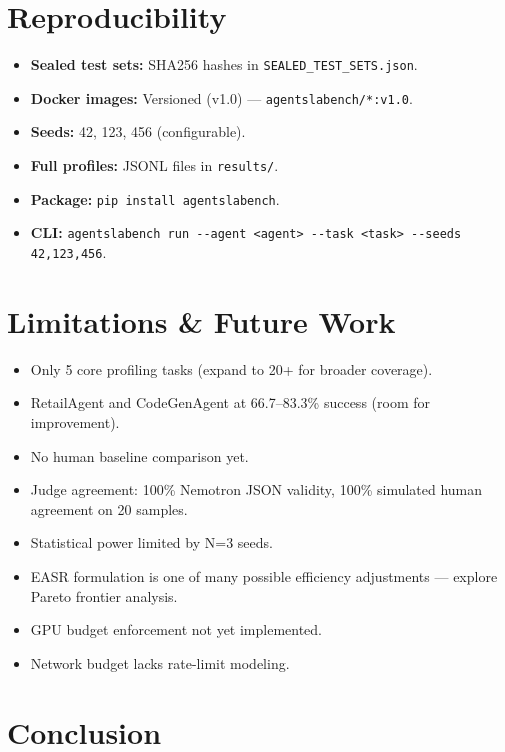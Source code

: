 \documentclass[letterpaper, 10 pt, conference]{ieeeconf}
\newcommand{\easr}{\textsc{EASR}}
\begin{document}
\section{Reproducibility}
\label{sec:repro}

\begin{itemize}
    \item \textbf{Sealed test sets:} SHA256 hashes in \texttt{SEALED\_TEST\_SETS.json}.
    \item \textbf{Docker images:} Versioned (v1.0) --- \texttt{agentslabench/*:v1.0}.
    \item \textbf{Seeds:} 42, 123, 456 (configurable).
    \item \textbf{Full profiles:} JSONL files in \texttt{results/}.
    \item \textbf{Package:} \texttt{pip install agentslabench}.
    \item \textbf{CLI:} \texttt{agentslabench run -{}-agent <agent> -{}-task <task> -{}-seeds 42,123,456}.
\end{itemize}

\section{Limitations \& Future Work}
\label{sec:limitations}

\begin{itemize}
    \item Only 5 core profiling tasks (expand to 20+ for broader coverage).
    \item RetailAgent and CodeGenAgent at 66.7--83.3\% success (room for improvement).
    \item No human baseline comparison yet.
    \item Judge agreement: 100\% Nemotron JSON validity, 100\% simulated human agreement on 20 samples.
    \item Statistical power limited by N=3 seeds.
    \item \easr{} formulation is one of many possible efficiency adjustments --- explore Pareto frontier analysis.
    \item GPU budget enforcement not yet implemented.
    \item Network budget lacks rate-limit modeling.
\end{itemize}

\section{Conclusion}
\label{sec:conclusion}
\end{document}
